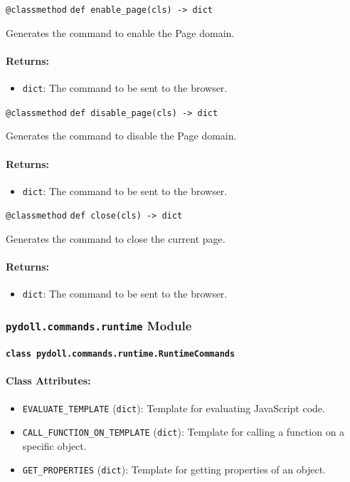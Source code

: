\documentclass{article}
\begin{document}
\noindent\texttt{@classmethod}
\noindent\texttt{def enable\_page(cls) -> dict}

\noindent Generates the command to enable the Page domain.

\paragraph{Returns:}
\begin{itemize}
    \item \texttt{dict}: The command to be sent to the browser.
\end{itemize}

\noindent\texttt{@classmethod}
\noindent\texttt{def disable\_page(cls) -> dict}

\noindent Generates the command to disable the Page domain.

\paragraph{Returns:}
\begin{itemize}
    \item \texttt{dict}: The command to be sent to the browser.
\end{itemize}

\noindent\texttt{@classmethod}
\noindent\texttt{def close(cls) -> dict}

\noindent Generates the command to close the current page.

\paragraph{Returns:}
\begin{itemize}
    \item \texttt{dict}: The command to be sent to the browser.
\end{itemize}

\subsubsection*{\texttt{pydoll.commands.runtime} Module}

\paragraph*{\texttt{class pydoll.commands.runtime.RuntimeCommands}}

\paragraph{Class Attributes:}
\begin{itemize}
    \item \texttt{EVALUATE\_TEMPLATE} (\texttt{dict}): Template for evaluating JavaScript code.
    \item \texttt{CALL\_FUNCTION\_ON\_TEMPLATE} (\texttt{dict}): Template for calling a function on a specific object.
    \item \texttt{GET\_PROPERTIES} (\texttt{dict}): Template for getting properties of an object.
\end{itemize}
\end{document}
